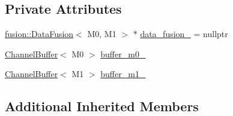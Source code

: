 \subsection*{Private Attributes}
\begin{DoxyCompactItemize}
\item 
\hyperlink{classapollo_1_1cyber_1_1data_1_1fusion_1_1DataFusion}{fusion\-::\-Data\-Fusion}$<$ M0, M1 $>$ $\ast$ \hyperlink{classapollo_1_1cyber_1_1data_1_1DataVisitor_3_01M0_00_01M1_00_01NullType_00_01NullType_01_4_a78ad754826bf212cdac717346331dfb2}{data\-\_\-fusion\-\_\-} = nullptr
\item 
\hyperlink{classapollo_1_1cyber_1_1data_1_1ChannelBuffer}{Channel\-Buffer}$<$ M0 $>$ \hyperlink{classapollo_1_1cyber_1_1data_1_1DataVisitor_3_01M0_00_01M1_00_01NullType_00_01NullType_01_4_a6cabc871c6cf0d49e3d5dbaf6081219c}{buffer\-\_\-m0\-\_\-}
\item 
\hyperlink{classapollo_1_1cyber_1_1data_1_1ChannelBuffer}{Channel\-Buffer}$<$ M1 $>$ \hyperlink{classapollo_1_1cyber_1_1data_1_1DataVisitor_3_01M0_00_01M1_00_01NullType_00_01NullType_01_4_a3a8ba95bb88c577c55e36ab2ac12e552}{buffer\-\_\-m1\-\_\-}
\end{DoxyCompactItemize}
\subsection*{Additional Inherited Members}


